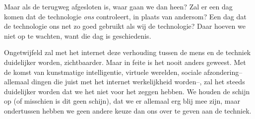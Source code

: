 \documentclass[11pt]{report}
\begin{document}
Maar als de terugweg afgesloten is, waar gaan we dan heen? Zal er een dag komen dat de technologie \emph{ons} controleert, in plaats van andersom? Een dag dat de technologie ons net zo goed gebruikt als wij de technologie? Daar hoeven we niet op te wachten, want die dag is geschiedenis.

Ongetwijfeld zal met het internet deze verhouding tussen de mens en de techniek duidelijker worden, zichtbaarder. Maar in feite is het nooit anders geweest. Met de komst van kunstmatige intelligentie, virtuele werelden, sociale afzondering--allemaal dingen die juist met het internet werkelijkheid worden--, zal het steeds duidelijker worden dat we het niet voor het zeggen hebben. We houden de schijn op (of misschien is dit geen schijn), dat we er allemaal erg blij mee zijn, maar ondertussen hebben we geen andere keuze dan ons over te geven aan de techniek.
\end{document}
